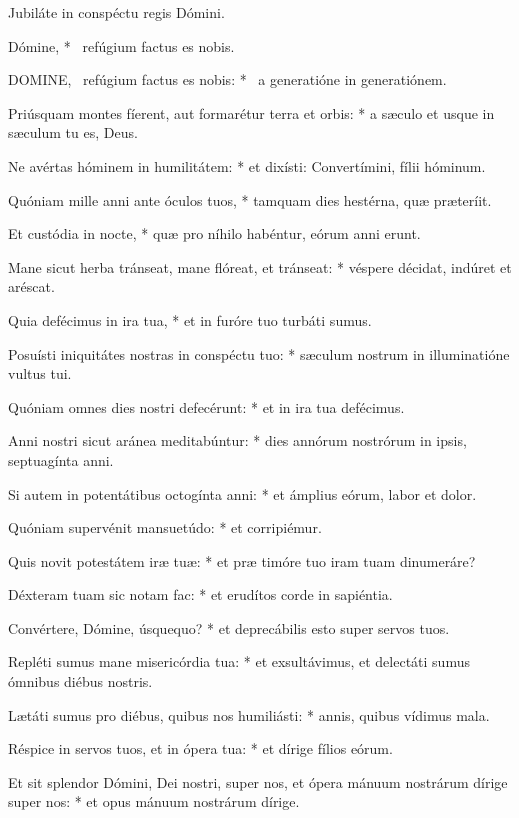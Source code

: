  Jubiláte in conspéctu regis Dómini.

 Dómine, * \textdagger\ refúgium factus es nobis. \textdaggerdbl


\lettrine[lines=2]{D}{OMINE}, \textdagger\ refúgium factus es nobis: * \textdaggerdbl\ a generatióne in generatiónem.

Priúsquam montes fíerent, aut formarétur terra et orbis: * a sæculo et usque in sæculum tu es, Deus.

Ne avértas hóminem in humilitátem: * et dixísti: Convertímini, fílii hóminum.

Quóniam mille anni ante óculos tuos, * tamquam dies hestérna, quæ præteríit.

Et custódia in nocte, * quæ pro níhilo habéntur, eórum anni erunt.

Mane sicut herba tránseat, mane flóreat, et tránseat: * véspere décidat, indúret et aréscat.

Quia defécimus in ira tua, * et in furóre tuo turbáti sumus.

Posuísti iniquitátes nostras in conspéctu tuo: * sæculum nostrum in illuminatióne vultus tui.

Quóniam omnes dies nostri defecérunt: * et in ira tua defécimus.

Anni nostri sicut aránea meditabúntur: * dies annórum nostrórum in ipsis, septuagínta anni.

Si autem in potentátibus octogínta anni: * et ámplius eórum, labor et dolor.

Quóniam supervénit mansuetúdo: * et corripiémur.

Quis novit potestátem iræ tuæ: * et præ timóre tuo iram tuam dinumeráre?

Déxteram tuam sic notam fac: * et erudítos corde in sapiéntia.

Convértere, Dómine, úsquequo? * et deprecábilis esto super servos tuos.

Repléti sumus mane misericórdia tua: * et exsultávimus, et delectáti sumus ómnibus diébus nostris.

Lætáti sumus pro diébus, quibus nos humiliásti: * annis, quibus vídimus mala.

Réspice in servos tuos, et in ópera tua: * et dírige fílios eórum.

Et sit splendor Dómini, Dei nostri, super nos, et ópera mánuum nostrárum dírige super nos: * et opus mánuum nostrárum dírige.

